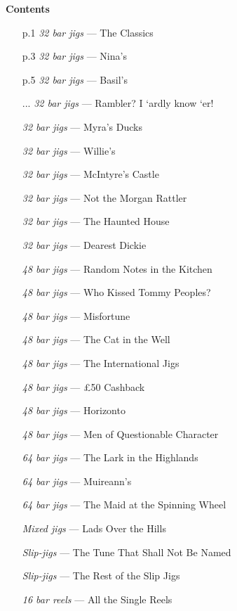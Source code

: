 \documentclass[11pt]{article}
\begin{document}
\centerline{\Large\textbf{Contents}}
\begin{multicols*}{2}
    \small
    \begin{enumerate}
        \item[p.1] \textit{32 bar jigs} --- The Classics
        \item[p.3] \textit{32 bar jigs} --- Nina's
        \item[p.5] \textit{32 bar jigs} --- Basil's
        \item[...] \textit{32 bar jigs} --- Rambler? I `ardly know `er!
        \item[] \textit{32 bar jigs} --- Myra's Ducks
        \item[] \textit{32 bar jigs} --- Willie's
        \item[] \textit{32 bar jigs} --- McIntyre's Castle
        \item[] \textit{32 bar jigs} --- Not the Morgan Rattler
        \item[] \textit{32 bar jigs} --- The Haunted House
        \item[] \textit{32 bar jigs} --- Dearest Dickie
        \item[] \textit{48 bar jigs} --- Random Notes in the Kitchen
        \item[] \textit{48 bar jigs} --- Who Kissed Tommy Peoples?
        \item[] \textit{48 bar jigs} --- Misfortune
        \item[] \textit{48 bar jigs} --- The Cat in the Well
        \item[] \textit{48 bar jigs} --- The International Jigs
        \item[] \textit{48 bar jigs} --- £50 Cashback
        \item[] \textit{48 bar jigs} --- Horizonto
        \item[] \textit{48 bar jigs} --- Men of Questionable Character
        \item[] \textit{64 bar jigs} --- The Lark in the Highlands
        \item[] \textit{64 bar jigs} --- Muireann's
        \item[] \textit{64 bar jigs} --- The Maid at the Spinning Wheel
        \item[] \textit{Mixed jigs} --- Lads Over the Hills
        \item[] \textit{Slip-jigs} --- The Tune That Shall Not Be Named
        \item[] \textit{Slip-jigs} --- The Rest of the Slip Jigs
        \item[] \textit{16 bar reels} --- All the Single Reels

\end{enumerate}
\end{multicols*}
\end{document}
